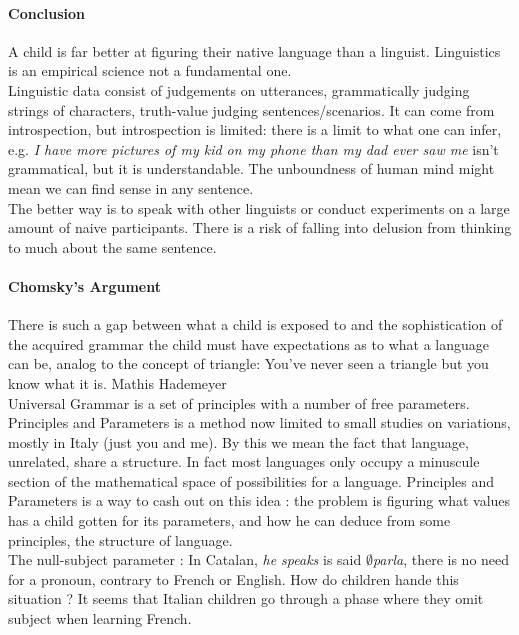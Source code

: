 \documentclass{cours}
\begin{document}
\paragraph{Conclusion}
A child is far better at figuring their native language than a linguist. Linguistics is an empirical science not a fundamental one. \\
Linguistic data consist of judgements on utterances, grammatically judging strings of characters, truth-value judging sentences/scenarios. It can come from introspection, but introspection is limited\!: there is a limit to what one can infer, e.g. \textsl{I have more pictures of my kid on my phone than my dad ever saw me} isn't grammatical, but it is understandable. The unboundness of human mind might mean we can find sense in any sentence.\\
The better way is to speak with other linguists or conduct experiments on a large amount of naive participants. There is a risk of falling into delusion from thinking to much about the same sentence.

\paragraph{Chomsky's Argument}
There is such a gap between what a child is exposed to and the sophistication of the acquired grammar the child must have expectations as to what a language can be, analog to the concept of triangle\!: You've never seen a triangle but you know what it is. Mathis Hademeyer\\
Universal Grammar is a set of principles with a number of free parameters. \\
Principles and Parameters is a method now limited to small studies on variations, mostly in Italy (just you and me). By this we mean the fact that language, unrelated, share a structure. In fact most languages only occupy a minuscule section of the mathematical space of possibilities for a language. Principles and Parameters is a way to cash out on this idea\! : the problem is figuring what values has a child gotten for its parameters, and how he can deduce from some principles, the structure of language. \\
The null-subject parameter\! : In Catalan, \textsl{he speaks} is said $\emptyset$\textsl{parla}, there is no need for a pronoun, contrary to French or English. How do children hande this situation ? It seems that Italian children go through a phase where they omit subject when learning French.
\end{document}
